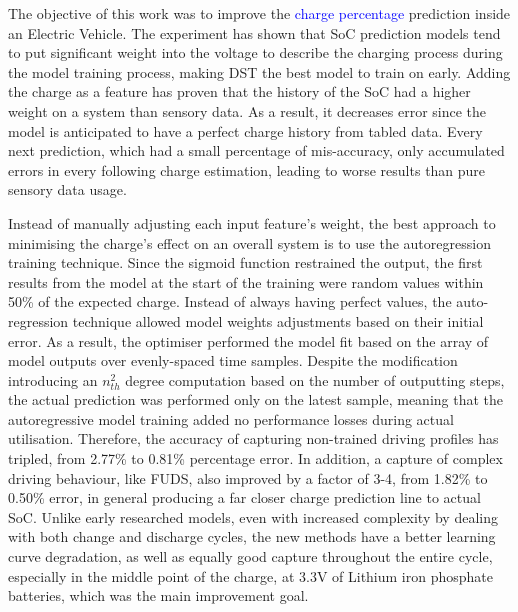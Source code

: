 {The objective of this work was to improve the \textcolor{blue}{charge percentage} prediction inside an Electric Vehicle.}
The experiment has shown that SoC prediction models tend to put significant weight into the voltage to describe the charging process during the model training process, making DST the best model to train on early.
Adding the charge as a feature has proven that the history of the SoC had a higher weight on a system than sensory data.
As a result, it decreases error since the model is anticipated to have a perfect charge history from tabled data.
Every next prediction, which had a small percentage of mis-accuracy, only accumulated errors in every following charge estimation, leading to worse results than pure sensory data usage.

%
%
Instead of manually adjusting each input feature's weight, the best approach to minimising the charge's effect on an overall system is to use the autoregression training technique. 
Since the sigmoid function restrained the output, the first results from the model at the start of the training were random values within 50\% of the expected charge.
Instead of always having perfect values, the auto-regression technique allowed model weights adjustments based on their initial error.
As a result, the optimiser performed the model fit based on the array of model outputs over evenly-spaced time samples.
Despite the modification introducing an $n_{th}^{2}$ degree computation based on the number of outputting steps, the actual prediction was performed only on the latest sample, meaning that the autoregressive model training added no performance losses during actual utilisation.
Therefore, the accuracy of capturing non-trained driving profiles has tripled, from 2.77\% to 0.81\% percentage error.
In addition, a capture of complex driving behaviour, like FUDS, also improved by a factor of 3-4, from 1.82\% to 0.50\% error, in general producing a far closer charge prediction line to actual SoC.
Unlike early researched models, even with increased complexity by dealing with both change and discharge cycles, the new methods have a better learning curve degradation, as well as equally good capture throughout the entire cycle, especially in the middle point of the charge, at 3.3V of Lithium iron phosphate batteries, which was the main improvement goal.

